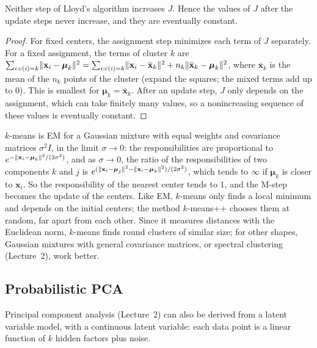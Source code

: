 \begin{proposition}\label{L4-prop:kmeans}
    Neither step of Lloyd's algorithm increases $J$. Hence the values of $J$ after the update steps never increase, and they are eventually constant.
\end{proposition}

\begin{proof}
    For fixed centers, the assignment step minimizes each term of $J$ separately. For a fixed assignment, the terms of cluster $k$ are $\sum_{i : c(i) = k}\lVert \mathbf{x}_i - \boldsymbol{\mu}_k \rVert^2 = \sum_{i : c(i) = k}\lVert \mathbf{x}_i - \bar{\mathbf{x}}_k \rVert^2 + n_k\lVert \bar{\mathbf{x}}_k - \boldsymbol{\mu}_k \rVert^2$, where $\bar{\mathbf{x}}_k$ is the mean of the $n_k$ points of the cluster (expand the squares; the mixed terms add up to $0$). This is smallest for $\boldsymbol{\mu}_k = \bar{\mathbf{x}}_k$. After an update step, $J$ only depends on the assignment, which can take finitely many values, so a nonincreasing sequence of these values is eventually constant.
\end{proof}

$k$-means is EM for a Gaussian mixture with equal weights and covariance matrices $\sigma^2I$, in the limit $\sigma \to 0$: the responsibilities are proportional to $e^{-\lVert \mathbf{x}_i - \boldsymbol{\mu}_k \rVert^2/(2\sigma^2)}$, and as $\sigma \to 0$, the ratio of the responsibilities of two components $k$ and $j$ is $e^{(\lVert \mathbf{x}_i - \boldsymbol{\mu}_j \rVert^2 - \lVert \mathbf{x}_i - \boldsymbol{\mu}_k \rVert^2)/(2\sigma^2)}$, which tends to $\infty$ if $\boldsymbol{\mu}_k$ is closer to $\mathbf{x}_i$. So the responsibility of the nearest center tends to $1$, and the M-step becomes the update of the centers. Like EM, $k$-means only finds a local minimum and depends on the initial centers; the method $k$-means++ chooses them at random, far apart from each other. Since it measures distances with the Euclidean norm, $k$-means finds round clusters of similar size; for other shapes, Gaussian mixtures with general covariance matrices, or spectral clustering (Lecture~2), work better.

\subsection{Probabilistic PCA}\label{L4-sec:ppca}

Principal component analysis (Lecture~2) can also be derived from a latent variable model, with a continuous latent variable: each data point is a linear function of $k$ hidden factors plus noise.

